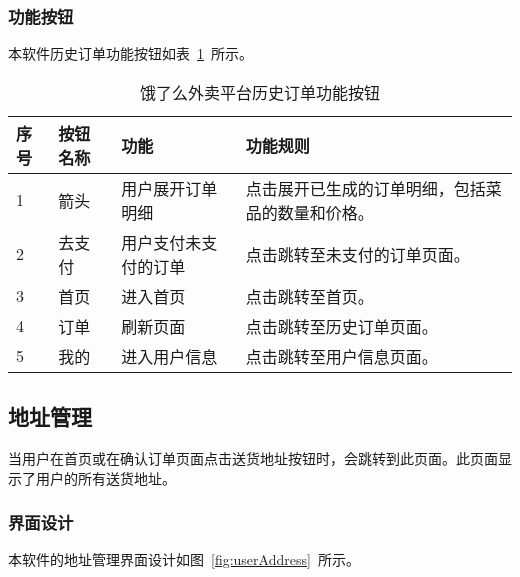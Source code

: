 \subsubsection{功能按钮}
本软件历史订单功能按钮如表~\ref{tab:table9}~所示。
\begin{table}[htbp]
    \caption{饿了么外卖平台历史订单功能按钮}\label{tab:table9}
    \vspace{0.5em}\wuhao
    \begin{tabularx}{\textwidth}{lllX}
    \toprule[1.5pt]
    序号 & 按钮名称 & 功能 & 功能规则 \\ 
    \midrule[1pt]
    1 & 箭头 & 用户展开订单明细 & 点击展开已生成的订单明细，包括菜品的数量和价格。 \\
    2 & 去支付 & 用户支付未支付的订单 & 点击跳转至未支付的订单页面。 \\
    3 & 首页 & 进入首页 & 点击跳转至首页。 \\
    4 & 订单 & 刷新页面 & 点击跳转至历史订单页面。 \\
    5 & 我的 & 进入用户信息 & 点击跳转至用户信息页面。 \\
\bottomrule[1.5pt]
\end{tabularx}
\vspace{\baselineskip}
\end{table}

\subsection{地址管理}
当用户在首页或在确认订单页面点击送货地址按钮时，会跳转到此页面。此页面显示了用户的所有送货地址。
\subsubsection{界面设计}
本软件的地址管理界面设计如图~\ref{fig:userAddress}~所示。
